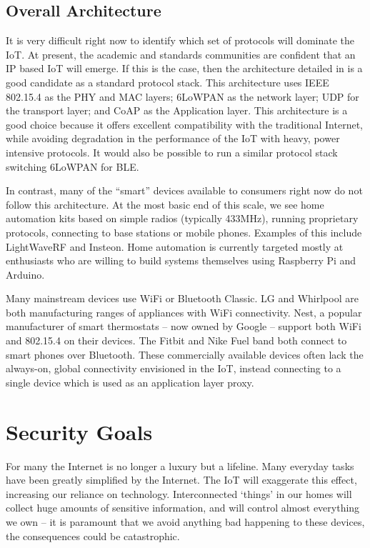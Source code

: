 \documentclass[10pt,journal,compsoc]{IEEEtran}
\begin{document}
\subsection{Overall Architecture}
It is very difficult right now to identify which set of protocols will dominate
the IoT. At present, the academic and standards communities are confident that
an IP based IoT will emerge. If this is the case, then the architecture
detailed in \cite{Palattella2013} is a good candidate as a standard protocol
stack. This architecture uses IEEE 802.15.4 as the PHY and MAC layers; 6LoWPAN
as the network layer; UDP for the transport layer; and CoAP as the Application
layer. This architecture is a good choice because it offers excellent
compatibility with the traditional Internet, while avoiding degradation in the
performance of the IoT with heavy, power intensive protocols. It would also be
possible to run a similar protocol stack switching 6LoWPAN for BLE. 

In contrast, many of the ``smart'' devices available to consumers right now do
not follow this architecture. At the most basic end of this scale, we see home
automation kits based on simple radios (typically 433MHz), running proprietary
protocols, connecting to base stations or mobile phones. Examples of this
include LightWaveRF and Insteon. Home automation is currently targeted mostly
at enthusiasts who are willing to build systems themselves using Raspberry Pi
and Arduino.  

Many mainstream devices use WiFi or Bluetooth Classic. LG and Whirlpool are
both manufacturing ranges of appliances with WiFi connectivity. Nest, a popular
manufacturer of smart thermostats -- now owned by Google -- support both WiFi
and 802.15.4 on their devices. The Fitbit and Nike Fuel band both connect to
smart phones over Bluetooth. These commercially available devices often lack
the always-on, global connectivity envisioned in the IoT, instead connecting
to a single device which is used as an application layer proxy.


\section{Security Goals}
For many the Internet is no longer a luxury but a lifeline. Many everyday tasks
have been greatly simplified by the Internet. The IoT will exaggerate this
effect, increasing our reliance on technology. Interconnected `things' in our
homes will collect huge amounts of sensitive information, and will control
almost everything we own -- it is paramount that we avoid anything bad
happening to these devices, the consequences could be catastrophic.
\end{document}
